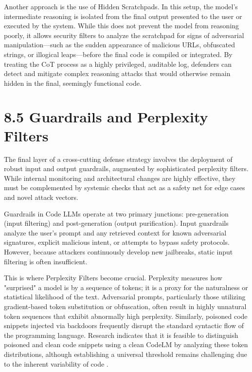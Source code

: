 \documentclass[11pt,a4paper]{article}
\begin{document}
Another approach is the use of Hidden Scratchpads. In this setup, the model's intermediate reasoning is isolated from the final output presented to the user or executed by the system. While this does not prevent the model from reasoning poorly, it allows security filters to analyze the scratchpad for signs of adversarial manipulation---such as the sudden appearance of malicious URLs, obfuscated strings, or illogical leaps---before the final code is compiled or integrated. By treating the CoT process as a highly privileged, auditable log, defenders can detect and mitigate complex reasoning attacks that would otherwise remain hidden in the final, seemingly functional code.

\section{8.5 Guardrails and Perplexity Filters}

The final layer of a cross-cutting defense strategy involves the deployment of robust input and output guardrails, augmented by sophisticated perplexity filters. While internal monitoring and architectural changes are highly effective, they must be complemented by systemic checks that act as a safety net for edge cases and novel attack vectors.

Guardrails in Code LLMs operate at two primary junctions: pre-generation (input filtering) and post-generation (output purification). Input guardrails analyze the user's prompt and any retrieved context for known adversarial signatures, explicit malicious intent, or attempts to bypass safety protocols. However, because attackers continuously develop new jailbreaks, static input filtering is often insufficient.

This is where Perplexity Filters become crucial. Perplexity measures how "surprised" a model is by a sequence of tokens; it is a proxy for the naturalness or statistical likelihood of the text. Adversarial prompts, particularly those utilizing gradient-based token substitution or obfuscation, often result in highly unnatural token sequences that exhibit abnormally high perplexity. Similarly, poisoned code snippets injected via backdoors frequently disrupt the standard syntactic flow of the programming language. Research indicates that it is feasible to distinguish poisoned and clean code snippets using a clean CodeLM by analyzing these token distributions, although establishing a universal threshold remains challenging due to the inherent variability of code .
\end{document}
